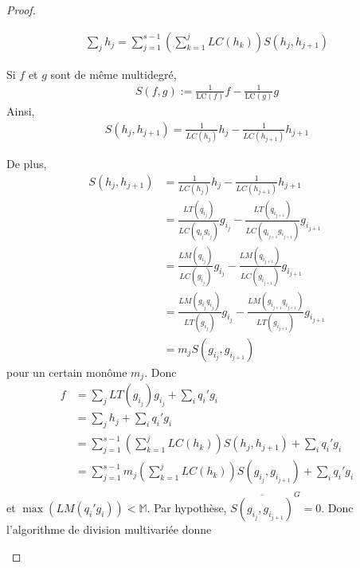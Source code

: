 \begin{proof}
\begin{enumerate}
                \begin{align*}
                    \sum_j h_j = \sum_{j = 1}^{s-1} \left(\sum_{k = 1}^j LC(h_k) \right) S(h_j,h_{j+1})
                \end{align*}
                \begin{remq}
                    Si $f$ et $g$ sont de même multidegré,
                    \begin{align*}
                        S(f,g) := \frac{1}{\mathrm{LC}(f)}f - \frac{1}{\mathrm{LC}(g)}g
                    \end{align*}
                    Ainsi,
                    \begin{align*}
                        S(h_j, h_{j+1}) = \frac{1}{LC(h_j)}h_j - \frac{1}{LC(h_{j+1})}h_{j+1}
                    \end{align*}
                \end{remq}
                De plus,
                \begin{align*}
                    S(h_j, h_{j+1}) &= \frac{1}{LC(h_j)}h_j - \frac{1}{LC(h_{j+1})}h_{j+1} \\
                    &= \frac{LT(q_{i_j})}{LC(q_{i_j}g_{i_j})}g_{i_j} - \frac{LT(q_{i_{j+1}})}{LC(q_{i_{j+1}}g_{i_{j+1}})}g_{i_{j+1}} \\
                    &= \frac{LM(q_{i_j})}{LC(g_{i_j})}g_{i_j} - \frac{LM(q_{i_{j+1}})}{LC(g_{i_{j+1}})}g_{i_{j+1}} \\
                    &= \frac{LM(g_{i_j}q_{i_j})}{LT(g_{i_j})}g_{i_j} - \frac{LM(g_{i_{j+1}}q_{i_{j+1}})}{LT(g_{i_{j+1}})}g_{i_{j+1}} \\
                    &= m_j S(g_{i_j}, g_{i_{j+1}})
                \end{align*}
                pour un certain monôme $m_j$. Donc
                \begin{align*}
                    f &= \sum_j LT(g_{i_j})g_{i_j} + \sum_i q_i'g_i \\
                    &= \sum_j h_j + \sum_i q_i'g_i \\
                    &= \sum_{j = 1}^{s-1} \left(\sum_{k = 1}^j LC(h_k) \right) S(h_j,h_{j+1}) + \sum_i q_i'g_i \\
                    &= \sum_{j = 1}^{s-1} m_j \left(\sum_{k = 1}^j LC(h_k) \right) S(g_{i_j},g_{i_{j+1}}) + \sum_i q_i'g_i \\
                \end{align*}
                et $\max (LM(q_i'g_i)) < \mathbb{M}$. Par hypothèse, $\overline{S(g_{i_j}, g_{i_{j+1}})}^G = 0$. Donc l'algorithme de division multivariée donne 

\end{enumerate}
\end{proof}
